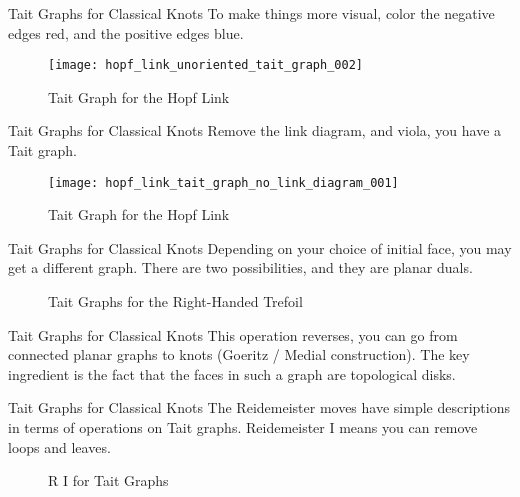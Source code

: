 \documentclass{beamer}
\begin{document}
    \begin{frame}{Tait Graphs for Classical Knots}
        To make things more visual, color the negative edges red, and the
        positive edges blue.
        \begin{figure}
            \centering
            \texttt{[image: hopf\_link\_unoriented\_tait\_graph\_002]}
            \label{fig:hopf_link_unoriented_tait_graph_002}
            \caption{Tait Graph for the Hopf Link}
        \end{figure}
    \end{frame}
    \begin{frame}{Tait Graphs for Classical Knots}
        Remove the link diagram, and viola, you have a Tait graph.
        \begin{figure}
            \centering
            \texttt{[image: hopf\_link\_tait\_graph\_no\_link\_diagram\_001]}
            \label{fig:hopf_link_tait_graph_no_link_diagram_001}
            \caption{Tait Graph for the Hopf Link}
        \end{figure}
    \end{frame}
    \begin{frame}{Tait Graphs for Classical Knots}
        Depending on your choice of initial face, you may get a different
        graph. There are two possibilities, and they are planar duals.
        \begin{figure}
            \centering
            \label{fig:trefoil_tait_graph_with_both_graphs_and_knot_diagram_001}
            \caption{Tait Graphs for the Right-Handed Trefoil}
        \end{figure}
    \end{frame}
    \begin{frame}{Tait Graphs for Classical Knots}
        This operation reverses, you can go from connected planar graphs to
        knots (Goeritz / Medial construction). The key ingredient is the fact
        that the faces in such a graph are topological disks.
    \end{frame}
    \begin{frame}{Tait Graphs for Classical Knots}
        The Reidemeister moves have simple descriptions in terms of operations
        on Tait graphs. Reidemeister I means you can remove loops and leaves.
        \begin{figure}
            \centering
            \caption{R I for Tait Graphs}
        \end{figure}
    \end{frame}
\end{document}
